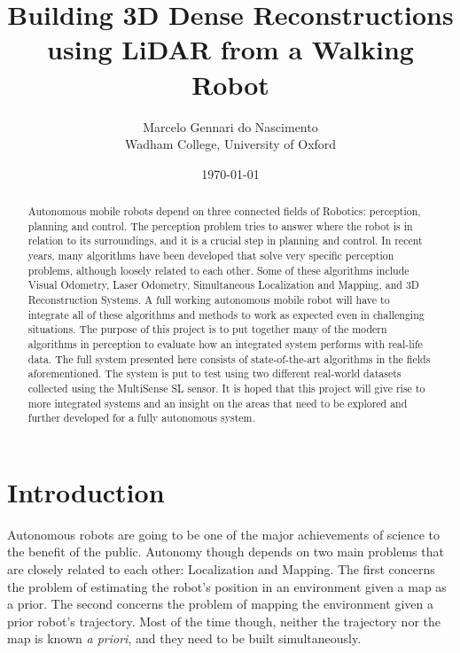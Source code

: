 \documentclass[11pt]{article}
\title{Building 3D Dense Reconstructions using LiDAR from a Walking Robot}
\author{Marcelo Gennari do Nascimento \\ Wadham College, University of Oxford}
\date{\today}
\begin{document}

	\maketitle

	\newpage

	\begin{abstract}
		Autonomous mobile robots depend on three connected fields of Robotics: perception, planning and control. The perception problem tries to answer where the robot is in relation to its surroundings, and it is a crucial step in planning and control.
		In recent years, many algorithms have been developed that solve very specific perception problems, although loosely related to each other. Some of these algorithms include Visual Odometry, Laser Odometry, Simultaneous Localization and Mapping, and 3D Reconstruction Systems.
		A full working autonomous mobile robot will have to integrate all of these algorithms and methods to work as expected even in challenging situations.
		The purpose of this project is to put together many of the modern algorithms in perception to evaluate how an integrated system performs with real-life data. The full system presented here consists of state-of-the-art algorithms in the fields aforementioned. The system is put to test using two different real-world datasets collected using the MultiSense SL sensor.
		It is hoped that this project will give rise to more integrated systems and an insight on the areas that need to be explored and further developed for a fully autonomous system.
	\end{abstract}

	\newpage
	\tableofcontents

	\newpage

	\section{Introduction}

Autonomous robots are going to be one of the major achievements of science to the benefit of the public. Autonomy though depends on two main problems that are closely related to each other: Localization and Mapping. The first concerns the problem of estimating the robot's position in an environment given a map as a prior. The second concerns the problem of mapping the environment given a prior robot's trajectory. Most of the time though, neither the trajectory nor the map is known \textit{a priori}, and they need to be built simultaneously. 
\end{document}
